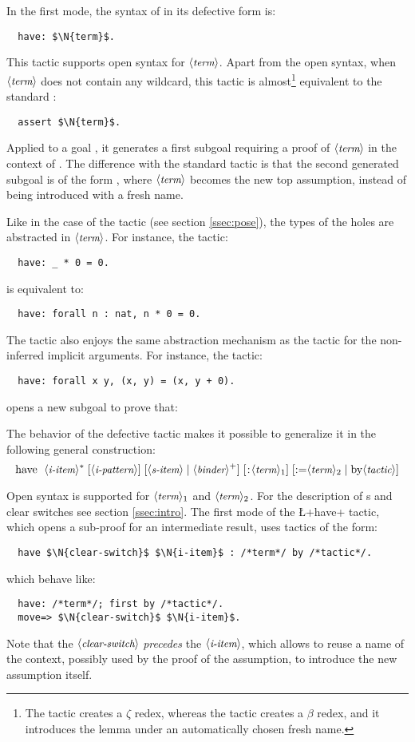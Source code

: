 In the first mode, the syntax of  in its defective form is:
\begin{lstlisting}
  have: $\N{term}$.
\end{lstlisting}
This tactic supports open syntax for $\langle\mbox{\itshape\rmfamily\small term}\rangle$. Apart from the open
syntax, when $\langle\mbox{\itshape\rmfamily\small term}\rangle$ does
not contain any wildcard, this tactic
is almost\footnote{The  tactic creates a $\zeta$ redex,
  whereas the  tactic creates a $\beta$ redex, and it
  introduces the lemma under an automatically chosen fresh name.}
equivalent to the standard \Coq{}:
\begin{lstlisting}
  assert $\N{term}$.
\end{lstlisting}
Applied to a goal , it generates a first subgoal requiring a
proof of $\langle\mbox{\itshape\rmfamily\small term}\rangle$ in the context of . The difference with
the standard \Coq{} tactic is that the second generated subgoal is of
the form , where $\langle\mbox{\itshape\rmfamily\small term}\rangle$ becomes the new top
assumption, instead of being introduced with a fresh name.

Like in the case of the  tactic (see section \ref{ssec:pose}),
the types of the holes are abstracted in $\langle\mbox{\itshape\rmfamily\small term}\rangle$.
For instance, the tactic:
\begin{lstlisting}
  have: _ * 0 = 0.
\end{lstlisting}
is equivalent to:
\begin{lstlisting}
  have: forall n : nat, n * 0 = 0.
\end{lstlisting}
The  tactic also enjoys the same abstraction mechanism as the
 tactic for the non-inferred implicit arguments. For instance,
the tactic:
\begin{lstlisting}
  have: forall x y, (x, y) = (x, y + 0).
\end{lstlisting}
opens a new subgoal to prove that:

\noindent{}


The behavior of the defective  tactic makes it possible to
generalize it in the
following general construction:
  $$\C{have }\ \;\N{i-item}^* \; [\N{i-pattern}] \;
     [\N{s-item}\;|\;\N{binder}^+]\;[\C{:} \N{term}_1]\;
     [\C{:=} \N{term}_2 \;|\; \C{by }\N{tactic}]$$

Open syntax is supported for $\langle\mbox{\itshape\rmfamily\small term}\rangle_1$ and $\langle\mbox{\itshape\rmfamily\small term}\rangle_2$. For the
description of
\iitem{}s and clear switches see section \ref{ssec:intro}.
The first mode of the \L+have+ tactic, which opens a sub-proof for an
intermediate result, uses tactics of the form:
\begin{lstlisting}
  have $\N{clear-switch}$ $\N{i-item}$ : /*term*/ by /*tactic*/.
\end{lstlisting}
which behave like:
\begin{lstlisting}
  have: /*term*/; first by /*tactic*/.
  move=> $\N{clear-switch}$ $\N{i-item}$.
\end{lstlisting}
Note that the $\langle\mbox{\itshape\rmfamily\small clear-switch}\rangle$ \emph{precedes} the
$\langle\mbox{\itshape\rmfamily\small i-item}\rangle$, which allows to reuse a name of the context, possibly used
by the proof of the assumption, to introduce the new assumption
itself.

